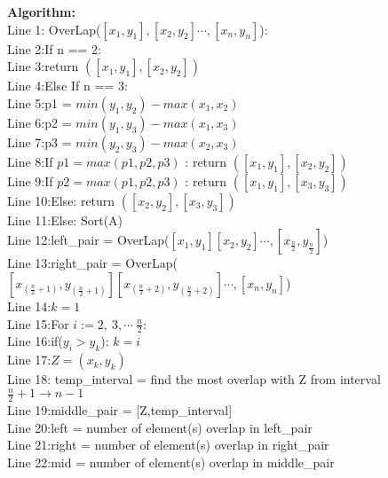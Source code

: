 \documentclass[11pt]{article}
\newcommand{\tab}{\hspace*{2em}}
\begin{document}
\noindent
\textbf{Algorithm:}\\
Line 1: OverLap($[x_1, y_1],[x_2, y_2] \cdots, [x_n, y_n]$):\\
Line 2:\tab If n == 2:\\
Line 3:\tab\tab return $([x_1,y_1],[x_2,y_2])$\\
Line 4:\tab Else If n == 3:\\
Line 5:\tab\tab p1 = $min(y_1,y_2) - max(x_1, x_2)$\\
Line 6:\tab\tab p2 = $min(y_1,y_3) - max(x_1, x_3)$\\
Line 7:\tab\tab p3 = $min(y_2,y_3) - max(x_2, x_3)$\\
Line 8:\tab\tab\tab If $p1 = max(p1,p2,p3)$ : return $([x_1,y_1],[x_2,y_2])$\\
Line 9:\tab\tab\tab If $p2 = max(p1,p2,p3)$ : return $([x_1,y_1],[x_3,y_3])$\\
Line 10:\tab\tab\tab Else: return $([x_2,y_2],[x_3,y_3])$\\
Line 11:\tab Else: Sort(A)\\
Line 12:\tab\tab left\_pair = OverLap($[x_1, y_1][x_2, y_2] \cdots,[x_{\frac{n}{2}}, y_{\frac{n}{2}}]$)\\
Line 13:\tab\tab right\_pair = OverLap($[x_{(\frac{n}{2} + 1)}, y_{(\frac{n}{2} + 1)}][x_{(\frac{n}{2} + 2)}, y_{(\frac{n}{2} + 2)}] \cdots,[x_n, y_n]$)\\
Line 14:\tab\tab $k = 1$\\
Line 15:\tab\tab For $i:= 2,\ 3,\cdots\ \frac{n}{2}$:\\
Line 16:\tab\tab\tab if($y_i > y_k$): $k = i$\\
Line 17:\tab\tab $Z = (x_k, y_k)$\\
Line 18:\tab\tab \large{} temp\_interval = find the most overlap with Z from interval $\frac{n}{2} + 1 \to n -1$\\
\Large{}
Line 19:\tab\tab middle\_pair = [Z,temp\_interval]\\%
Line 20:\tab\tab left = number of element(s) overlap in left\_pair\\
Line 21:\tab\tab right = number of element(s) overlap in right\_pair\\
Line 22:\tab\tab mid = number of element(s) overlap in middle\_pair\\
\end{document}
